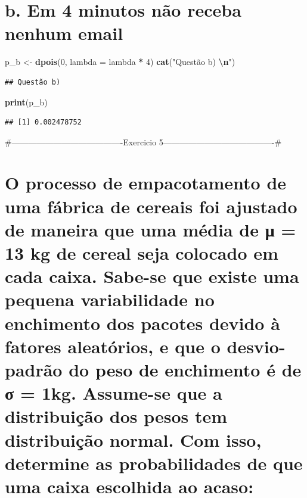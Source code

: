 \documentclass[
]{article}
\newenvironment{Shaded}{\begin{snugshade}}{\end{snugshade}}
\newcommand{\AttributeTok}[1]{\textcolor[rgb]{0.13,0.29,0.53}{#1}}
\newcommand{\DecValTok}[1]{\textcolor[rgb]{0.00,0.00,0.81}{#1}}
\newcommand{\FunctionTok}[1]{\textcolor[rgb]{0.13,0.29,0.53}{\textbf{#1}}}
\newcommand{\NormalTok}[1]{#1}
\newcommand{\OtherTok}[1]{\textcolor[rgb]{0.56,0.35,0.01}{#1}}
\newcommand{\SpecialCharTok}[1]{\textcolor[rgb]{0.81,0.36,0.00}{\textbf{#1}}}
\newcommand{\StringTok}[1]{\textcolor[rgb]{0.31,0.60,0.02}{#1}}
\begin{document}
\section{b. Em 4 minutos não receba nenhum
email}\label{b.-em-4-minutos-nuxe3o-receba-nenhum-email}

\begin{Shaded}
\begin{Highlighting}[]
\NormalTok{p\_b }\OtherTok{\textless{}{-}} \FunctionTok{dpois}\NormalTok{(}\DecValTok{0}\NormalTok{, }\AttributeTok{lambda =}\NormalTok{ lambda }\SpecialCharTok{*} \DecValTok{4}\NormalTok{)}
\FunctionTok{cat}\NormalTok{(}\StringTok{"Questão b) }\SpecialCharTok{\textbackslash{}n}\StringTok{"}\NormalTok{)}
\end{Highlighting}
\end{Shaded}

\begin{verbatim}
## Questão b)
\end{verbatim}

\begin{Shaded}
\begin{Highlighting}[]
\FunctionTok{print}\NormalTok{(p\_b)}
\end{Highlighting}
\end{Shaded}

\begin{verbatim}
## [1] 0.002478752
\end{verbatim}

\#----------------------------------------Exercicio
5----------------------------------------\#

\section{O processo de empacotamento de uma fábrica de cereais foi
ajustado de maneira que uma média de μ = 13 kg de cereal seja colocado
em cada caixa. Sabe-se que existe uma pequena variabilidade no
enchimento dos pacotes devido à fatores aleatórios, e que o
desvio-padrão do peso de enchimento é de σ = 1kg. Assume-se que a
distribuição dos pesos tem distribuição normal. Com isso, determine as
probabilidades de que uma caixa escolhida ao
acaso:}\label{o-processo-de-empacotamento-de-uma-fuxe1brica-de-cereais-foi-ajustado-de-maneira-que-uma-muxe9dia-de-ux3bc-13-kg-de-cereal-seja-colocado-em-cada-caixa.-sabe-se-que-existe-uma-pequena-variabilidade-no-enchimento-dos-pacotes-devido-uxe0-fatores-aleatuxf3rios-e-que-o-desvio-padruxe3o-do-peso-de-enchimento-uxe9-de-ux3c3-1kg.-assume-se-que-a-distribuiuxe7uxe3o-dos-pesos-tem-distribuiuxe7uxe3o-normal.-com-isso-determine-as-probabilidades-de-que-uma-caixa-escolhida-ao-acaso}
\end{document}
